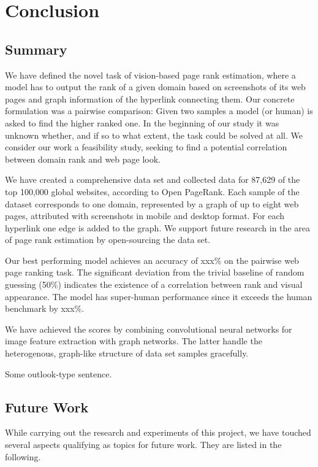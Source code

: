 \section{Conclusion}
\label{sec:conclusion}

\subsection{Summary}

We have defined the novel task of vision-based page rank estimation, where a model has to output the rank of a given domain based on screenshots of its web pages and graph information of the hyperlink connecting them. Our concrete formulation was a pairwise comparison: Given two samples a model (or human) is asked to find the higher ranked one. In the beginning of our study it was unknown whether, and if so to what extent, the task could be solved at all. We consider our work a feasibility study, seeking to find a potential correlation between domain rank and web page look.

We have created a comprehensive data set and collected data for 87,629 of the top 100,000 global websites, according to Open PageRank. Each sample of the dataset corresponds to one domain, represented by a graph of up to eight web pages, attributed with screenshots in mobile and desktop format. For each hyperlink one edge is added to the graph. We support future research in the area of page rank estimation by open-sourcing the data set.

Our best performing model achieves an accuracy of xxx\% on the pairwise web page ranking task. The significant deviation from the trivial baseline of random guessing (50\%) indicates the existence of a correlation between rank and visual appearance. The model has super-human performance since it exceeds the human benchmark by xxx\%.

We have achieved the scores by combining convolutional neural networks for image feature extraction with graph networks. The latter handle the heterogenous, graph-like structure of data set samples gracefully.

Some outlook-type sentence.

\subsection{Future Work}

While carrying out the research and experiments of this project, we have touched several aspects qualifying as topics for future work. They are listed in the following.

